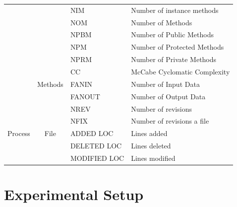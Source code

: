 \documentclass[sigconf]{acmart}
\theoremstyle{break}
\begin{document}
{\begin{table}[]
\begin{tabular}{|p{1cm}|c|l|p{3cm}|}
                                  &                                   & NIM         & Number of instance methods     \\ \cline{3-4} 
                                  &                                   & NOM         & Number of Methods              \\ \cline{3-4} 
                                  &                                   & NPBM        & Number of Public Methods       \\ \cline{3-4} 
                                  &                                   & NPM         & Number of Protected Methods    \\ \cline{3-4} 
                                  &                                   & NPRM        & Number of Private Methods      \\ \cline{2-4} 
                                  & \multirow{3}{*}{Methods}          & CC          & McCabe Cyclomatic Complexity   \\ \cline{3-4} 
                                  &                                   & FANIN       & Number of Input Data           \\ \cline{3-4} 
                                  &                                   & FANOUT      & Number of Output Data          \\ \hline
\multirow{5}{*}{Process }  & \multirow{5}{*}{File}             & NREV        & Number of revisions            \\ \cline{3-4} 
                                  &                                   & NFIX        & Number of revisions a file     \\ \cline{3-4} 
                                  &                                   & ADDED LOC    & Lines added                    \\ \cline{3-4} 
                                  &                                   & DELETED LOC  & Lines deleted                  \\ \cline{3-4} 
                                  &                                   & MODIFIED LOC & Lines modified                 \\ \hline
\end{tabular}
\end{table}
}


\section{Experimental Setup}
\label{sec:Experimental}
\end{document}
